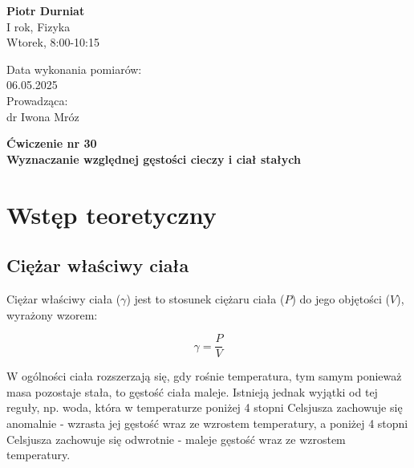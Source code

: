 \documentclass[a4paper,12pt]{article}
\begin{document}
\noindent
\begin{minipage}{0.5\textwidth}
    \raggedright
    \textbf{Piotr Durniat} \\
    I rok, Fizyka \\
    Wtorek, 8:00-10:15 \\
    \vspace{0.5cm}
    \vspace{0.5cm}
\end{minipage}%
\begin{minipage}{0.5\textwidth}
    \raggedleft
    Data wykonania pomiarów: \\
    06.05.2025 \\
    \vspace{0.5cm} %
    Prowadząca: \\
    dr Iwona Mróz
\end{minipage}

\vspace{2cm} %
\begin{center}
    \LARGE \textbf{Ćwiczenie nr 30} \\[0.5cm]
    \Large \textbf{Wyznaczanie względnej gęstości cieczy i ciał stałych}
\end{center}

\vspace{1cm} %
\noindent

\tableofcontents
\newpage

\section{Wstęp teoretyczny}

\subsection*{Ciężar właściwy ciała}

Ciężar właściwy ciała ($\gamma$) jest to stosunek ciężaru ciała ($P$) do jego objętości ($V$), wyrażony wzorem:

\begin{equation*}
    \gamma = \frac{P}{V}
\end{equation*}


W ogólności ciała rozszerzają się, gdy rośnie temperatura, tym samym ponieważ masa pozostaje stała, to gęstość ciała maleje. Istnieją jednak wyjątki od tej reguły, np. woda, która w temperaturze poniżej 4 stopni Celsjusza zachowuje się anomalnie - wzrasta jej gęstość wraz ze wzrostem temperatury, a poniżej 4 stopni Celsjusza zachowuje się odwrotnie - maleje gęstość wraz ze wzrostem temperatury.
\end{document}
